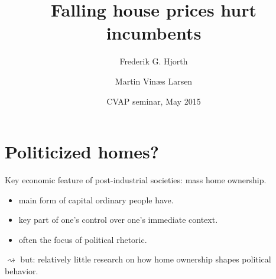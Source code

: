 \documentclass[aspectratio=169]{beamer}
\title[Power and responsibility]{Falling house prices hurt incumbents}
\author{Frederik G. Hjorth \and Martin Vinæs Larsen}
\institute[UCPH]{\large{Department of Political Science \\ University of Copenhagen}}
\date[May 2015]{CVAP seminar, May 2015}
\begin{document}
	
	\begin{frame}
		\titlepage
	\end{frame}
	
	
\section{Politicized homes?}

	\begin{frame}
	Key economic feature of post-industrial societies: mass home ownership.
	
	\vspace{0.2in}

	\begin{itemize}
		\item main form of capital ordinary people have.
		\item key part of one's control over one's immediate context.
		\item often the focus of political rhetoric.
	\end{itemize}
	
		\vspace{0.2in}
		
	$\rightsquigarrow$ but: relatively little research on how home ownership shapes political behavior.
		\end{frame}	
	
\end{document}
